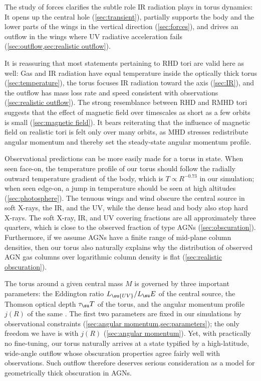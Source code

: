 \documentclass[twocolumn]{article}
\newcommand*\xray{\texorpdfstring{X\protect\nobreakdash-ray}{X-ray}}
\newcommand*\xrays{\xray s}
\begin{document}
The study of forces clarifies the subtle role \ac{IR} radiation plays in torus
dynamics: It opens up the central hole (\cref{sec:transient}), partially
supports the body and the lower parts of the wings in the vertical direction
(\cref{sec:forces}), and drives an outflow in the wings where \ac{UV} radiative
acceleration fails (\cref{sec:outflow,sec:realistic outflow}).

It is reassuring that most statements pertaining to \ac{RHD} tori are valid
here as well: Gas and \ac{IR} radiation have equal temperature inside the
optically thick torus (\cref{sec:temperature}), the torus focuses \ac{IR}
radiation toward the axis (\cref{sec:IR}), and the outflow has mass loss rate
and speed consistent with observations (\cref{sec:realistic outflow}). The
strong resemblance between \ac{RHD} and \ac{RMHD} tori suggests that the effect
of magnetic field over timescales as short as a few orbits is small
(\cref{sec:magnetic field}). It bears reiterating that the influence of
magnetic field on realistic tori is felt only over many orbits, as \ac{MHD}
stresses redistribute angular momentum and thereby set the steady-state angular
momentum profile.

Observational predictions can be more easily made for a torus in
 state. When seen face-on, the temperature profile of our
torus should follow the radially outward temperature gradient of the body,
which is $T\propto R^{-0.73}$ in our simulation; when seen edge-on, a jump in
temperature should be seen at high altitudes (\cref{sec:photosphere}). The
tenuous wings and wind obscure the central source in soft \xrays, the \ac{IR},
and the \ac{UV}, while the dense head and body also stop hard \xrays. The soft
\xray, \ac{IR}, and \ac{UV} covering fractions are all approximately three
quarters, which is close to the observed fraction of type
\acp{AGN} (\cref{sec:obscuration}). Furthermore, if we assume \acp{AGN} have a
finite range of mid-plane column densities, then our torus also naturally
explains why the distribution of observed \ac{AGN} gas columns over logarithmic
column density is flat (\cref{sec:realistic obscuration}).

The torus around a given central mass $M$ is governed by three important
parameters: the Eddington ratio $L_\su{UV}/L_\su E$ of the central source, the
Thomson optical depth $\tau_\su T$ of the torus, and the angular momentum
profile $j(R)$ of the same . The first two
parameters are fixed in our simulations by observational constraints
(\cref{sec:angular momentum,sec:parameters}); the only freedom we have is with
$j(R)$ (\cref{sec:angular momentum}). Yet, with practically no fine-tuning, our
torus naturally arrives at a  state typified by a
high-latitude, wide-angle outflow whose obscuration properties agree fairly
well with observations. Such outflow therefore deserves serious consideration
as a model for geometrically thick obscuration in \acp{AGN}.
\end{document}
